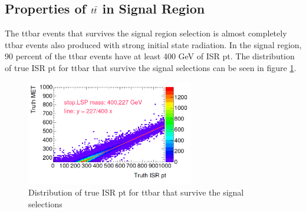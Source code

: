 \subsection{Properties of $t\bar{t}$ in Signal Region}
\label{sec:Bkg:ttbar:SR}

\indent The ttbar events that survives the signal region selection is almost completely ttbar events also produced with strong initial state radiation.  In the signal region, 90 percent of the ttbar events have at least 400 GeV of ISR pt.  The distribution of true ISR pt for ttbar that survive the signal selections can be seen in figure \ref{fig:ttbar:SR:trueISRpt}.\\

\begin{figure}[h!]
  \centering
	\includegraphics[width=0.65\textwidth]{./figures/MET_ISR.png}
\caption{\label{fig:ttbar:SR:trueISRpt}{Distribution of true ISR pt for ttbar that survive the signal selections}}
\end{figure}

